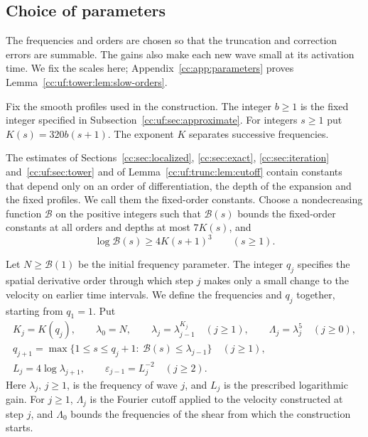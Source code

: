 \subsection{Choice of parameters}\label{cc:sec:parameters}
The frequencies and orders are chosen so that the truncation and correction
errors are summable. The gains also make each new wave small at its
activation time. We fix the scales here; Appendix~\ref{cc:app:parameters}
proves Lemma~\ref{cc:uf:tower:lem:slow-orders}.

Fix the smooth profiles used in the construction.
The integer $b\ge1$ is the fixed integer specified in
Subsection~\ref{cc:uf:sec:approximate}.
For integers $s\ge1$ put $K(s)=320b(s+1)$.
The exponent $K$ separates successive frequencies.

The estimates of Sections~\ref{cc:sec:localized}, \ref{cc:sec:exact},
\ref{cc:sec:iteration} and~\ref{cc:uf:sec:tower} and of
Lemma~\ref{cc:uf:trunc:lem:cutoff} contain constants that depend only
on an order of differentiation, the depth of the expansion and the
fixed profiles. We call them the fixed-order constants. Choose a
nondecreasing function $\mathcal B$ on the positive integers such that
$\mathcal B(s)$ bounds the fixed-order constants at all orders and
depths at most $7K(s)$, and
\begin{equation}\label{cc:par:floor}
 \log\mathcal B(s)\ge4K(s+1)^3\qquad(s\ge1).
\end{equation}

Let $N\ge\mathcal B(1)$ be the initial frequency parameter. The integer
$q_j$ specifies the spatial derivative order through which step $j$
makes only a small change to the velocity on earlier time intervals.
We define the frequencies and $q_j$ together, starting from $q_1=1$.
Put
\begin{equation}\label{cc:uf:tower:eq:schedule}
 \begin{gathered}
 K_j=K(q_j),\qquad
 \lambda_0=N,\qquad \lambda_j=\lambda_{j-1}^{K_j}\quad(j\ge1),\qquad
 \Lambda_j=\lambda_j^5\quad(j\ge0),\\
 q_{j+1}=\max\{1\le s\le q_j+1:\ \mathcal B(s)\le\lambda_{j-1}\}\quad(j\ge1),\\
 L_j=4\log\lambda_{j+1},\qquad
 \varepsilon_{j-1}=L_j^{-2}
 \quad(j\ge2).
 \end{gathered}
\end{equation}
Here $\lambda_j$, $j\ge1$, is the frequency of wave $j$, and $L_j$ is the
prescribed logarithmic gain. For $j\ge1$, $\Lambda_j$ is the Fourier cutoff
applied to the velocity constructed at step $j$, and $\Lambda_0$ bounds
the frequencies of the shear from which the construction starts.

